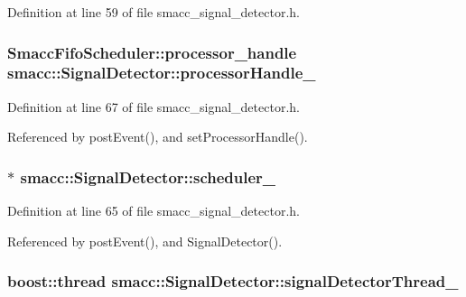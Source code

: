 Definition at line 59 of file smacc\+\_\+signal\+\_\+detector.\+h.

\subsubsection[{\texorpdfstring{processor\+Handle\+\_\+}{processorHandle_}}]{\setlength{\rightskip}{0pt plus 5cm}Smacc\+Fifo\+Scheduler\+::processor\+\_\+handle smacc\+::\+Signal\+Detector\+::processor\+Handle\+\_\+\hspace{0.3cm}{\ttfamily [private]}}\hypertarget{classsmacc_1_1SignalDetector_a9a77dc9f0e9f8f56dff5e76077abcb78}{}\label{classsmacc_1_1SignalDetector_a9a77dc9f0e9f8f56dff5e76077abcb78}


Definition at line 67 of file smacc\+\_\+signal\+\_\+detector.\+h.



Referenced by post\+Event(), and set\+Processor\+Handle().

\subsubsection[{\texorpdfstring{scheduler\+\_\+}{scheduler_}}]{$\ast$ smacc\+::\+Signal\+Detector\+::scheduler\+\_\+\hspace{0.3cm}{\ttfamily [private]}}\hypertarget{classsmacc_1_1SignalDetector_adaee5b9b91d0e6305dc1ab30f7ab566d}{}\label{classsmacc_1_1SignalDetector_adaee5b9b91d0e6305dc1ab30f7ab566d}


Definition at line 65 of file smacc\+\_\+signal\+\_\+detector.\+h.



Referenced by post\+Event(), and Signal\+Detector().

\subsubsection[{\texorpdfstring{signal\+Detector\+Thread\+\_\+}{signalDetectorThread_}}]{\setlength{\rightskip}{0pt plus 5cm}boost\+::thread smacc\+::\+Signal\+Detector\+::signal\+Detector\+Thread\+\_\+\hspace{0.3cm}{\ttfamily [private]}}\hypertarget{classsmacc_1_1SignalDetector_a4346a400cd37eafc5d1d2e63d975785e}{}\label{classsmacc_1_1SignalDetector_a4346a400cd37eafc5d1d2e63d975785e}


